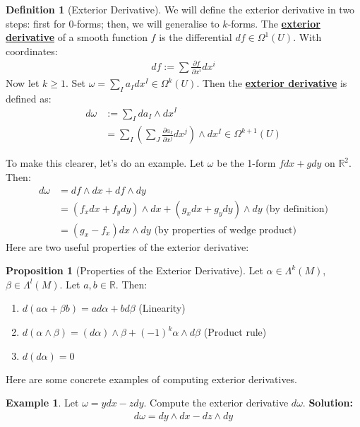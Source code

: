 \documentclass[11pt]{scrartcl}
\newcommand{\R}[0]{\mathbb{R}}
\theoremstyle{definition}
\newtheorem{definition}{Definition}
\newtheorem{prop}{Proposition}
\newtheorem{ex}{Example}
\theoremstyle{remark}
\newcommand{\dfn}[1]{\textbf{\underline{#1}}}
\begin{document}
{\begin{definition}[Exterior Derivative]
	We will define the exterior derivative in two steps: first for $0$-forms; then, we will generalise to $k$-forms. The \dfn{exterior derivative} of a smooth function $f$ is the differential $df \in \Omega^1 (U)$. With coordinates: 
	\begin{align*}
		df := \sum \frac{\partial f}{\partial x^i} dx^i
	\end{align*}
	Now let $k \geq 1$. Set $\omega = \sum_{I} a_I dx^I \in \Omega^k(U)$. Then the \dfn{exterior derivative} is defined as: 
	\begin{align*}
		d \omega & := \sum_{I} da_I \wedge dx^I \\
				 & = \sum_{I} \left( \sum_{J} \frac{\partial a_I}{\partial x^j } dx^j \right) \wedge dx^I \in \Omega^{k+1}(U)
	\end{align*}
\end{definition}
To make this clearer, let's do an example. Let $\omega$ be the 1-form $f dx + g dy$ on $\R^2$. Then: 
\begin{align*}
	d \omega & = df \wedge dx + df \wedge dy \\
				&  = (f_x dx + f_y dy ) \wedge dx + (g_x dx + g_y dy ) \wedge dy  \text{ (by definition)} \\
				& = (g_x - f_x) dx \wedge dy \text{ (by properties of wedge product) } 
\end{align*}
Here are two useful properties of the exterior derivative: 
\begin{prop}[Properties of the Exterior Derivative]
	Let $\alpha \in \Lambda^k(M)$, $\beta \in \Lambda^l(M)$. Let $a, b \in \R$. Then: 
	\begin{enumerate}[noitemsep]
		\item $d(a \alpha + \beta b) = a d \alpha + b d \beta$ (Linearity) 
		\item $d(\alpha \wedge \beta) = ( d \alpha) \wedge \beta + (-1)^k \alpha \wedge d \beta$ (Product rule) 
		\item $d(d \alpha) = 0$ 
	\end{enumerate}
\end{prop}

Here are some concrete examples of computing exterior derivatives.
\begin{ex}
	Let $\omega = ydx - z dy$. Compute the exterior derivative $d \omega$. \textbf{Solution:} 
	\begin{align*}
		d \omega = dy \wedge dx - dz \wedge dy 
	\end{align*}
\end{ex}

}
\end{document}
